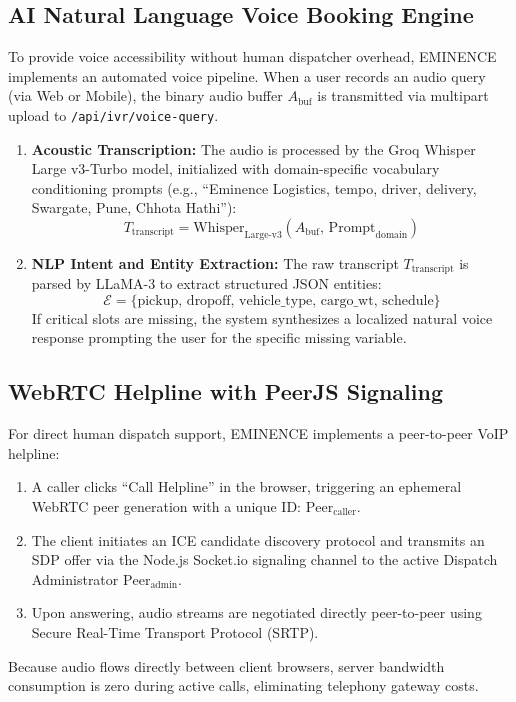 \documentclass[conference]{IEEEtran}
\begin{document}
\subsection{AI Natural Language Voice Booking Engine}
To provide voice accessibility without human dispatcher overhead, EMINENCE implements an automated voice pipeline. When a user records an audio query (via Web or Mobile), the binary audio buffer $A_{\text{buf}}$ is transmitted via multipart upload to \texttt{/api/ivr/voice-query}.

\begin{enumerate}
    \item \textbf{Acoustic Transcription:} The audio is processed by the Groq Whisper Large v3-Turbo model, initialized with domain-specific vocabulary conditioning prompts (e.g., ``Eminence Logistics, tempo, driver, delivery, Swargate, Pune, Chhota Hathi''):
    \begin{equation}
        T_{\text{transcript}} = \text{Whisper}_{\text{Large-v3}}\left(A_{\text{buf}}, \, \text{Prompt}_{\text{domain}}\right)
    \end{equation}
    \item \textbf{NLP Intent and Entity Extraction:} The raw transcript $T_{\text{transcript}}$ is parsed by LLaMA-3 to extract structured JSON entities:
    \begin{equation}
        \mathcal{E} = \{\text{pickup}, \, \text{dropoff}, \, \text{vehicle\_type}, \, \text{cargo\_wt}, \, \text{schedule}\}
    \end{equation}
    If critical slots are missing, the system synthesizes a localized natural voice response prompting the user for the specific missing variable.
\end{enumerate}

\subsection{WebRTC Helpline with PeerJS Signaling}
For direct human dispatch support, EMINENCE implements a peer-to-peer VoIP helpline:
\begin{enumerate}
    \item A caller clicks ``Call Helpline'' in the browser, triggering an ephemeral WebRTC peer generation with a unique ID: $\text{Peer}_{\text{caller}}$.
    \item The client initiates an ICE candidate discovery protocol and transmits an SDP offer via the Node.js Socket.io signaling channel to the active Dispatch Administrator $\text{Peer}_{\text{admin}}$.
    \item Upon answering, audio streams are negotiated directly peer-to-peer using Secure Real-Time Transport Protocol (SRTP).
\end{enumerate}
Because audio flows directly between client browsers, server bandwidth consumption is zero during active calls, eliminating telephony gateway costs.
\end{document}
